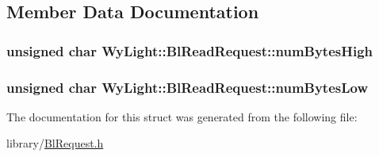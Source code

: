 \subsection{Member Data Documentation}
\hypertarget{struct_wy_light_1_1_bl_read_request_abaf19abf5aa4e5e787eae732210b5c81}{
\subsubsection[{num\-Bytes\-High}]{\setlength{\rightskip}{0pt plus 5cm}unsigned char Wy\-Light\-::\-Bl\-Read\-Request\-::num\-Bytes\-High}}\label{struct_wy_light_1_1_bl_read_request_abaf19abf5aa4e5e787eae732210b5c81}
\hypertarget{struct_wy_light_1_1_bl_read_request_afcf7c581f226c10726999e4aca344137}{
\subsubsection[{num\-Bytes\-Low}]{\setlength{\rightskip}{0pt plus 5cm}unsigned char Wy\-Light\-::\-Bl\-Read\-Request\-::num\-Bytes\-Low}}\label{struct_wy_light_1_1_bl_read_request_afcf7c581f226c10726999e4aca344137}


The documentation for this struct was generated from the following file\-:\begin{DoxyCompactItemize}
\item 
library/\hyperlink{_bl_request_8h}{Bl\-Request.\-h}\end{DoxyCompactItemize}
